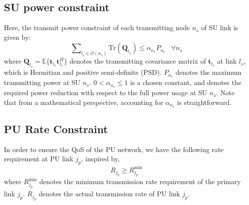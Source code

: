 \documentclass[12pt,onecolumn,tworows]{IEEEtran}
\begin{document}
\subsection{SU power constraint}

Here, the transmit power constraint of each transmitting node ${n_s}$ of SU link is given by:
\begin{equation}\label{2}
\sum\nolimits_{{l_s} \in \mathcal{O}({n_s})} {\text{Tr}({{\mathbf{Q}}_{{l_s}}})}  \leqslant {\alpha_{n_s} P_{{n_s}}}\;\;\;\forall {n_s}
\end{equation}
where ${{\mathbf{Q}}_{{l_s}}} = {\mathbb{E}}\{ {{\mathbf{t}}_{{l_s}}}{{\mathbf{t}}^H_{{l_s}}}\}$ denotes the transmitting covariance matrix of ${{\mathbf{t}}_{{l_s}}}$ at link ${l_s}$, which is Hermitian and positive semi-definite (PSD).
${P_{{n_s}}}$ denotes the maximum transmitting power  at SU $n_s$.
$0<\alpha_{n_s}\leq1$  is a chosen constant, and denotes the required power reduction with respect to the full power usage at SU $n_s$.  Note that from a mathematical perspective, accounting for $\alpha_{n_s}$ is straightforward.

\subsection{PU Rate Constraint}

In order to ensure the QoS of the PU network, we have the following rate requirement at PU link $j_p$, inspired by\cite{RuiZhangICL2012},
\begin{equation}\label{purequire}
  R_{j_p}\geq R_{j_p}^{\text{min}}\end{equation}
where ${{{R}}_{{j_p}}^{ \text{min}}}$ denotes the minimum transmission rate requirement of the primary link ${j_p}$.
$R_{j_p}$ denotes the actual transmission rate of PU link ${j_p}$.
\end{document}
